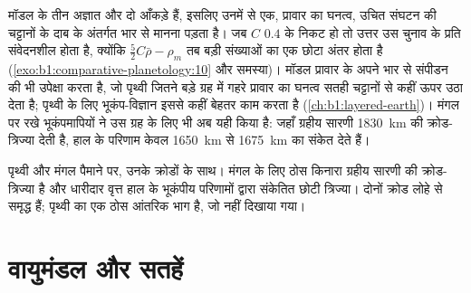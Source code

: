 मॉडल के तीन अज्ञात और दो आँकड़े हैं, इसलिए उनमें से एक, प्रावार का घनत्व, उचित संघटन की चट्टानों के दाब के अंतर्गत भार से मानना पड़ता है। जब $C$ $0.4$ के निकट हो तो उत्तर उस चुनाव के प्रति संवेदनशील
होता है, क्योंकि $\tfrac52C\bar\rho - \rho_m$ तब बड़ी संख्याओं का एक छोटा अंतर होता है
(\cref{exo:b1:comparative-planetology:10} और समस्या)। मॉडल प्रावार के अपने भार से संपीडन की भी उपेक्षा
करता है, जो पृथ्वी जितने बड़े ग्रह में गहरे प्रावार का घनत्व सतही चट्टानों से कहीं ऊपर उठा देता है;
पृथ्वी के लिए भूकंप-विज्ञान इससे कहीं बेहतर काम करता है (\cref{ch:b1:layered-earth})। मंगल पर रखे
भूकंपमापियों ने उस ग्रह के लिए भी अब यही किया है: जहाँ ग्रहीय सारणी \qty{1830}{km} की क्रोड-त्रिज्या
देती है, हाल के परिणाम केवल \qty{1650}{km} से \qty{1675}{km} का संकेत देते हैं।

\begin{omfigure}

{\small पृथ्वी और मंगल पैमाने पर, उनके क्रोडों के साथ। मंगल के लिए ठोस किनारा ग्रहीय सारणी की क्रोड-त्रिज्या
है और धारीदार वृत्त हाल के भूकंपीय परिणामों द्वारा संकेतित छोटी त्रिज्या। दोनों क्रोड लोहे से समृद्ध
हैं; पृथ्वी का एक ठोस आंतरिक भाग है, जो नहीं दिखाया गया।}
\end{omfigure}

\section{वायुमंडल और सतहें}

